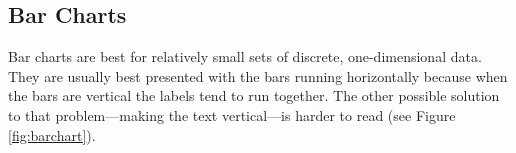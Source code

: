 \begin{enumerate}
%
%
%
%
\end{enumerate}

\subsection*{Bar Charts}

Bar charts are best for relatively small sets of discrete, one-dimensional data.  They are usually best presented with the bars running horizontally because when the bars are vertical the labels tend to run together.  The other possible solution to that problem---making the text vertical---is harder to read (see Figure \ref{fig:barchart}).  



